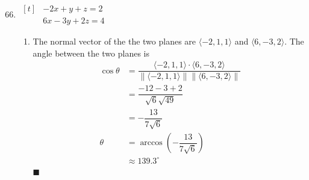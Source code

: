 \begin{enumerate}
    \setcounter{enumi}{65}
    \item $\begin{aligned}[t] & -2 x+y+z=2 \\ & 6 x-3 y+2 z=4\end{aligned}$

          \sol{}
          \begin{enumerate}
              \item The normal vector of the the two planes are $\langle -2, 1, 1 \rangle$ and
                    $\langle 6, -3, 2 \rangle$. The angle between the two planes is
                    \begin{align*}
                        \cos\theta & = \dfrac{\langle -2, 1, 1 \rangle \cdot \langle 6, -3, 2 \rangle}{\left\lVert \langle -2, 1, 1 \rangle \right\rVert \left\lVert \langle 6, -3, 2 \rangle \right\rVert} \\
                                   & = \dfrac{-12 - 3 + 2}{\sqrt{6} \sqrt{49}}                                                                                                                              \\
                                   & = -\dfrac{13}{7\sqrt{6}}                                                                                                                                               \\
                        \theta     & = \arccos \left( -\dfrac{13}{7\sqrt{6}} \right)                                                                                                                        \\
                                   & \approx 139.3^{\circ}
                    \end{align*} \hfill $\blacksquare$


\end{enumerate}
\end{enumerate}
